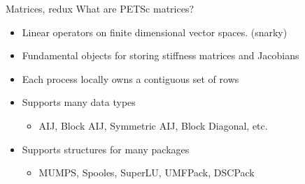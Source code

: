 \begin{frame}{Matrices, redux}
What are PETSc matrices?
\begin{itemize}
\item Linear operators on finite dimensional vector spaces. (snarky)
  \item<2> Fundamental objects for storing stiffness matrices and Jacobians
  \item<2> Each process locally owns a contiguous set of rows
  \item<2> Supports many data types
  \begin{itemize}
    \item AIJ, Block AIJ, Symmetric AIJ, Block Diagonal, etc.
  \end{itemize}
  \item<2> Supports structures for many packages
  \begin{itemize}
    \item MUMPS, Spooles, SuperLU, UMFPack, DSCPack
  \end{itemize}
\end{itemize}
\end{frame}
